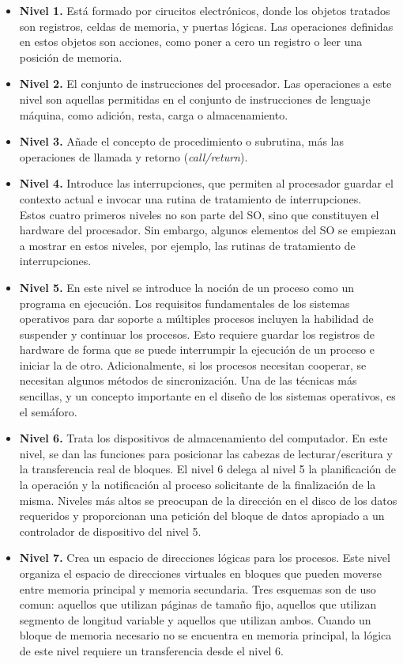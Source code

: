 \documentclass{article}
\begin{document}
				\begin{itemize}
				\item \textbf{Nivel 1.} Está formado por cirucitos electrónicos, donde los objetos tratados son registros, celdas de memoria, y puertas lógicas. Las operaciones definidas en estos objetos son acciones, como poner a cero un registro o leer una posición de memoria.
				\item \textbf{Nivel 2.} El conjunto de instrucciones del procesador. Las operaciones a este nivel son aquellas permitidas en el conjunto de instrucciones de lenguaje máquina, como adición, resta, carga o almacenamiento.		
				\item \textbf{Nivel 3.} Añade el concepto de procedimiento o subrutina, más las operaciones de llamada y retorno (\textit{call/return}).
				\item \textbf{Nivel 4.} Introduce las interrupciones, que permiten al procesador guardar el contexto actual e invocar una rutina de tratamiento de interrupciones. \\
				
				Estos cuatro primeros niveles no son parte del SO, sino que constituyen el hardware del procesador. Sin embargo, algunos elementos del SO se empiezan a mostrar en estos niveles, por ejemplo, las rutinas de tratamiento de interrupciones.
				
				\item \textbf{Nivel 5.} En este nivel se introduce la noción de un proceso como un programa en ejecución. Los requisitos fundamentales de los sistemas operativos para dar soporte a múltiples procesos incluyen la habilidad de suspender y continuar los procesos. Esto requiere guardar los registros de hardware de forma que se puede interrumpir la ejecución de un proceso e iniciar la de otro. Adicionalmente, si los procesos necesitan cooperar, se necesitan algunos métodos de sincronización. Una de las técnicas más sencillas, y un concepto importante en el diseño de los sistemas operativos, es el semáforo.
				\item \textbf{Nivel 6.} Trata los dispositivos de almacenamiento del computador. En este nivel, se dan las funciones para posicionar las cabezas de lecturar/escritura y la transferencia real de bloques. El nivel 6 delega al nivel 5 la planificación de la operación y la notificación al proceso solicitante de la finalización de la misma. Niveles más altos se preocupan de la dirección en el disco de los datos requeridos y proporcionan una petición del bloque de datos apropiado a un controlador de dispositivo del nivel 5.
				\item \textbf{Nivel 7.} Crea un espacio de direcciones lógicas para los procesos. Este nivel organiza el espacio de direcciones virtuales en bloques que pueden moverse entre memoria principal y memoria secundaria. Tres esquemas son de uso comun: aquellos que utilizan páginas de tamaño fijo, aquellos que utilizan segmento de longitud variable y aquellos que utilizan ambos. Cuando  un bloque de memoria necesario no se encuentra en memoria principal, la lógica de este nivel requiere un transferencia desde el nivel 6. \\
				

\end{itemize}
\end{document}
